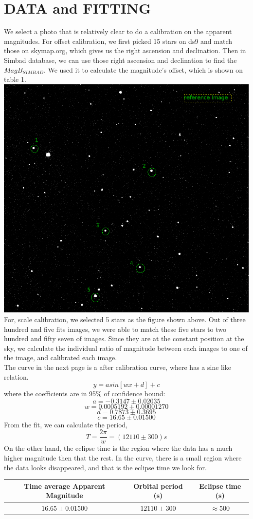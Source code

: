 \documentclass[10pt,journal,compsoc]{IEEEtran}
\begin{document}
\section{DATA and FITTING}
We select a photo that is relatively clear to do a calibration on the apparent magnitudes. For offset calibration, we first picked 15 stars on ds9 and match those on skymap.org, which gives us the right ascension and declination. Then in Simbad database, we can use those right ascension and declination to find the $MagB_{SIMBAD}$. We used it to calculate the magnitude's offset, which is shown on table 1.
\includegraphics[scale=0.3]{reference_image.png}
For, scale calibration, we selected 5 stars as the figure shown above. Out of three hundred and five fits images, we were able to match these five stars to two hundred and fifty seven of images. Since they are at the constant position at the sky, we calculate the individual ratio of magnitude between each images to one of the image, and calibrated each image. 
\\The curve in the next page is a after calibration curve, where has a sine like relation. $$y=asin[wx+d]+c$$where the coefficients are in 95\% of confidence bound:
$$a=-0.3147\pm0.02035$$$$w=0.0005192\pm0.00001270$$$$d=0.7873\pm0.3695$$$$c=16.65\pm0.01500$$From the fit, we can calculate the period, $$T= \frac{2\pi}{w}=(12110\pm300) s$$On the other hand, the eclipse time is the region where the data has a much higher magnitude then that the rest. In the curve, there is a small region where the data looks disappeared, and that is the eclipse time we look for.
\begin{table}[h!]
\label{table:3}
\begin{tabular}{|c c c|}
\hline
Time average Apparent Magnitude & Orbital period (s)& Eclipse time (s)\\  [1 ex] \hline\hline
$16.65\pm0.01500$ & $12110\pm300$ & $\approx500$ \\ [1ex]\hline
\end{tabular}
\end{table}
 
\end{document}
